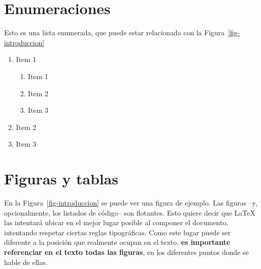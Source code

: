 \documentclass[
  letterpaper,
  DIV=11,
  numbers=noendperiod]{scrreprt}
\providecommand{\tightlist}{%
  \setlength{\itemsep}{0pt}\setlength{\parskip}{0pt}}\usepackage{longtable,booktabs,array}
\begin{document}
\section{Enumeraciones}\label{sec-enumeraciones}

\noindent Esto es una lista enumerada, que puede estar relacionada con
la Figura~\ref{fig-introduccion}

\begin{enumerate}
\def\labelenumi{\arabic{enumi}.}
\tightlist
\item
  Item 1

  \begin{enumerate}
  \def\labelenumii{\arabic{enumii}.}
  \tightlist
  \item
    Item 1
  \item
    Item 2
  \item
    Item 3
  \end{enumerate}
\item
  Item 2
\item
  Item 3
\end{enumerate}

\section{Figuras y tablas}\label{figuras-y-tablas}

\noindent En la Figura~\ref{fig-introduccion} se puede ver una figura de
ejemplo. Las figuras --y, opcionalmente, los listados de código-- son
flotantes. Esto quiere decir que \LaTeX{} las intentará ubicar en el
mejor lugar posible al componer el documento, intentando respetar
ciertas reglas tipográficas. Como este lugar puede ser diferente a la
posición que realmente ocupan en el texto, \textbf{es importante
referenciar en el texto todas las figuras}, en los diferentes puntos
donde se hable de ellas.
\end{document}
